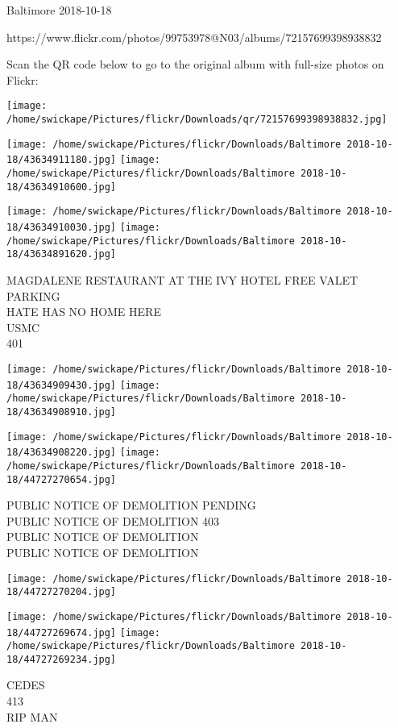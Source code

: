 \documentclass[10pt,letterpaper]{article}
\begin{document}
Baltimore 2018-10-18

https://www.flickr.com/photos/99753978@N03/albums/72157699398938832

Scan the QR code below to go to the original album with full-size photos on Flickr:

\texttt{[image: /home/swickape/Pictures/flickr/Downloads/qr/72157699398938832.jpg]}
\pagebreak

\texttt{[image: /home/swickape/Pictures/flickr/Downloads/Baltimore 2018-10-18/43634911180.jpg]}
\texttt{[image: /home/swickape/Pictures/flickr/Downloads/Baltimore 2018-10-18/43634910600.jpg]}

\texttt{[image: /home/swickape/Pictures/flickr/Downloads/Baltimore 2018-10-18/43634910030.jpg]}
\texttt{[image: /home/swickape/Pictures/flickr/Downloads/Baltimore 2018-10-18/43634891620.jpg]}

MAGDALENE RESTAURANT AT THE IVY HOTEL FREE VALET PARKING\\
HATE HAS NO HOME HERE\\
USMC\\
401
\pagebreak

\texttt{[image: /home/swickape/Pictures/flickr/Downloads/Baltimore 2018-10-18/43634909430.jpg]}
\texttt{[image: /home/swickape/Pictures/flickr/Downloads/Baltimore 2018-10-18/43634908910.jpg]}

\texttt{[image: /home/swickape/Pictures/flickr/Downloads/Baltimore 2018-10-18/43634908220.jpg]}
\texttt{[image: /home/swickape/Pictures/flickr/Downloads/Baltimore 2018-10-18/44727270654.jpg]}

PUBLIC NOTICE OF DEMOLITION PENDING\\
PUBLIC NOTICE OF DEMOLITION 403\\
PUBLIC NOTICE OF DEMOLITION\\
PUBLIC NOTICE OF DEMOLITION
\pagebreak

\texttt{[image: /home/swickape/Pictures/flickr/Downloads/Baltimore 2018-10-18/44727270204.jpg]}

\vspace{0.25in}
\texttt{[image: /home/swickape/Pictures/flickr/Downloads/Baltimore 2018-10-18/44727269674.jpg]}
\texttt{[image: /home/swickape/Pictures/flickr/Downloads/Baltimore 2018-10-18/44727269234.jpg]}

CEDES\\
413\\
RIP MAN
\pagebreak
\end{document}

